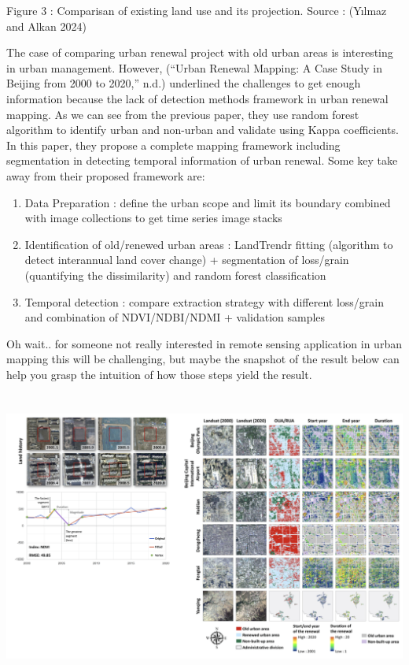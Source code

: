\documentclass[
  letterpaper,
  DIV=11,
  numbers=noendperiod]{scrreprt}
\providecommand{\tightlist}{%
  \setlength{\itemsep}{0pt}\setlength{\parskip}{0pt}}\usepackage{longtable,booktabs,array}
\begin{document}
Figure 3 : Comparisan of existing land use and its projection. Source :
(Yılmaz and Alkan 2024)

The case of comparing urban renewal project with old urban areas is
interesting in urban management. However, ({``Urban Renewal Mapping: A
Case Study in Beijing from 2000 to 2020,''} n.d.) underlined the
challenges to get enough information because the lack of detection
methods framework in urban renewal mapping. As we can see from the
previous paper, they use random forest algorithm to identify urban and
non-urban and validate using Kappa coefficients. In this paper, they
propose a complete mapping framework including segmentation in detecting
temporal information of urban renewal. Some key take away from their
proposed framework are:

\begin{enumerate}
\def\labelenumi{\arabic{enumi}.}
\tightlist
\item
  Data Preparation : define the urban scope and limit its boundary
  combined with image collections to get time series image stacks
\item
  Identification of old/renewed urban areas : LandTrendr fitting
  (algorithm to detect interannual land cover change) + segmentation of
  loss/grain (quantifying the dissimilarity) and random forest
  classification
\item
  Temporal detection : compare extraction strategy with different
  loss/grain and combination of NDVI/NDBI/NDMI + validation samples
\end{enumerate}

Oh wait.. for someone not really interested in remote sensing
application in urban mapping this will be challenging, but maybe the
snapshot of the result below can help you grasp the intuition of how
those steps yield the result.

\hypertarget{section}{%
\section{\texorpdfstring{\protect\includegraphics[width=7.83333in,height=\textheight]{images/clipboard-2246403998.png}}{}}\label{section}}
\end{document}
